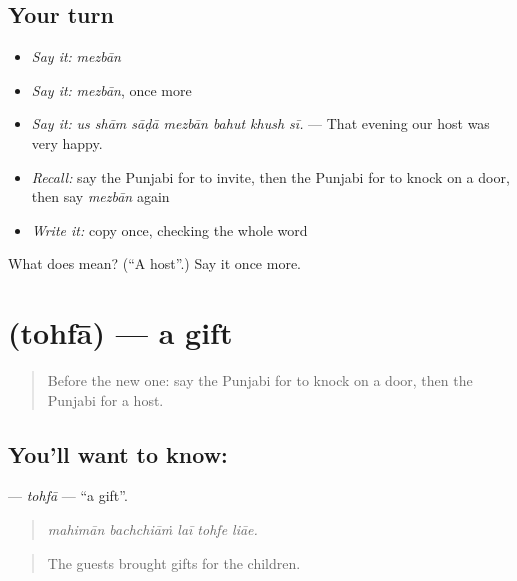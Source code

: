 \subsection*{Your turn}
\begin{itemize}
\raggedright
  \item \emph{Say it:} \emph{mezbān}
  \item \emph{Say it:} \emph{mezbān}, once more
  \item \emph{Say it:} \emph{us shām sāḍā mezbān bahut khush sī.} — That evening our host was very happy.
  \item \emph{Recall:} say the Punjabi for to invite, then the Punjabi for to knock on a door, then say \emph{mezbān} again
  \item \emph{Write it:} copy \textbf{} once, checking the whole word
\end{itemize}

\begin{tcolorbox}[breakable,colback=teal!4,colframe=teal!35!black,title={Before you move on}]
What does  mean? (\textquotedblleft{}A host\textquotedblright{}.) Say it once more.
\end{tcolorbox}
\section[\texorpdfstring{\pa{ਤੋਹਫ਼ਾ} (tohfā)}{ਤੋਹਫ਼ਾ (tohfā)}]{ (tohfā) — a gift}

\label{lesson:PA-C312-tohfa}



\begin{quote}
Before the new one: say the Punjabi for to knock on a door, then the Punjabi for a host.
\end{quote}

\subsection*{You'll want to know: }
\textbf{} — \emph{tohfā} — \textquotedblleft{}a gift\textquotedblright{}.

\begin{quote}
    
\end{quote}

\begin{quote}
\emph{mahimān bachchiāṁ laī tohfe liāe.}
\end{quote}

\begin{quote}
The guests brought gifts for the children.
\end{quote}

